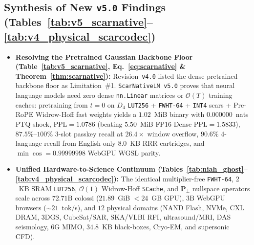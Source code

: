 \documentclass[10pt,twocolumn]{article}
\begin{document}
\subsection{Synthesis of New \texttt{v5.0} Findings (Tables~\ref{tab:v5_scarnative}--\ref{tab:v4_physical_scarcodec})}
\begin{itemize}
    \item \textbf{Resolving the Pretrained Gaussian Backbone Floor (Table~\ref{tab:v5_scarnative}, Eq.~\ref{eq:scarnative} \& Theorem~\ref{thm:scarnative}):} Revision~\texttt{v4.0} listed the dense pretrained backbone floor as Limitation~\#1. \texttt{ScarNativeLM v5.0} proves that neural language models need zero dense \texttt{nn.Linear} matrices or $\mathcal{O}(T)$ training caches: pretraining from $t=0$ on $D_4$ \texttt{LUT256} + \texttt{FWHT-64} + \texttt{INT4} scars + Pre-RoPE Widrow-Hoff fast weights yields a $1.02$~MiB binary with $0.000000$~nats PTQ shock, $\mathrm{PPL}=1.0786$ (beating $5.50$~MiB FP16 Dense $\mathrm{PPL}=1.5833$), $87.5\%$--$100\%$ $3$-slot passkey recall at $26.4\times$ window overflow, $90.6\%$ $4$-language recall from English-only $8.0$~KB RRR cartridges, and $\min\cos=0.99999998$ WebGPU WGSL parity.
    \item \textbf{Unified Hardware-to-Science Continuum (Tables~\ref{tab:niah_ghost}--\ref{tab:v4_physical_scarcodec}):} The identical multiplier-free \texttt{FWHT-64}, $2$~KB SRAM \texttt{LUT256}, $\mathcal{O}(1)$ Widrow-Hoff \texttt{SCache}, and $\mathbf{P}_\perp$ nullspace operators scale across $72.71\text{B}$ colossi ($21.89$~GiB $<24$~GB GPU), $3\text{B}$ WebGPU browsers ($\sim 21$~tok/s), and $12$ physical domains (NAND Flash, NVMe, CXL DRAM, 3DGS, CubeSat/SAR, SKA/VLBI RFI, ultrasound/MRI, DAS seismology, 6G MIMO, $34.8$~KB black-boxes, Cryo-EM, and supersonic CFD).
\end{itemize}
\end{document}
